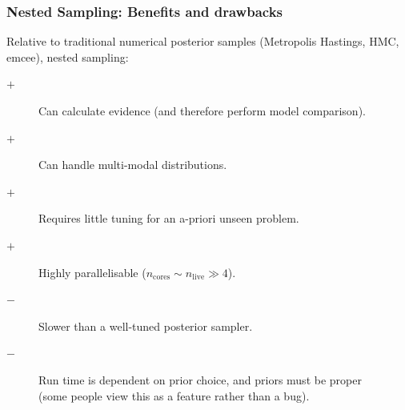 \documentclass[aspectratio=169]{beamer}
\begin{document}
\begin{frame}
    \frametitle{Nested Sampling: Benefits and drawbacks}
    Relative to traditional numerical posterior samples (Metropolis Hastings, HMC, emcee), nested sampling:
    \begin{description}
        \item[$+$] Can calculate evidence (and therefore perform model comparison).
        \item[$+$] Can handle multi-modal distributions.
        \item[$+$] Requires little tuning for an a-priori unseen problem.
        \item[$+$] Highly parallelisable ($n_\mathrm{cores} \sim n_\mathrm{live} \gg 4$).
        \item[$-$] Slower than a well-tuned posterior sampler.
        \item[$-$] Run time is dependent on prior choice, and priors must be proper \\(some people view this as a feature rather than a bug).
    \end{description}
\end{frame}
\end{document}

